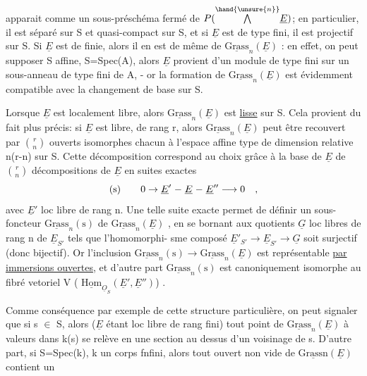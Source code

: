 
apparait comme un sous-préschéma fermé de $P(\overset{\hand{\unsure{n}}}{\bigwedge}\underline{E})$; en particulier, il
est séparé sur S et quasi-compact sur S, et  si $\underline{E}$  est de type fini,
il est projectif sur S. Si $\underline{E}$ est de  finie, alors
il en est de même de $\underline{\text{Grass}}_n(\underline{E})$ : en effet,  on peut
supposer S affine, S=Spec(A), alors $\underline{E}$ provient d'un module de type fini
sur un sous-anneau de type fini de A, -  or la formation de $\underline{\text{Grass}}_n(\underline{E})$
est évidemment compatible avec la changement de base sur S.

Lorsque $\underline{E}$  est localement libre, alors  $\underline{\text{Grass}}_n(\underline{E})$
est \uline{lisse} sur S. Cela provient du fait plus précis: si $\underline{E}$ est libre,
de rang r, alors  $\underline{\text{Grass}}_n(\underline{E})$  peut être recouvert par  $\binom{r}{n}$  ouverts
isomorphes chacun  à  l'espace affine type de dimension relative
n(r-n)  sur S.  Cette décomposition correspond au choix grâce à la base
de $\underline{E}$  de  $\binom{r}{n}$  décompositions de $\underline{E}$  en  suites
exactes
\[
\text{(s)} \qquad 0 \rightarrow \underline{E}' \relbar \underline{E} \relbar \underline{E}'' \longrightarrow 0 \quad ,
\]
avec $\underline{E}'$  loc libre de rang n.  Une telle suite exacte permet
de définir un sous-foncteur  $\underline{\text{Grass}}_n(\text{s})$  de  $\underline{\text{Grass}}_n(\underline{E})$ , en se bornant
aux  quotients  $\underline{G}$  loc libres de rang  n de  $\underline{E}_{S'}$  tels que l'homomorphi-%
sme composé  $\underline{E}'_{S'} \longrightarrow \underline{E}_{S'} \longrightarrow \underline{G}$  soit surjectif (donc bijectif). Or
l'inclusion  $\underline{\text{Grass}}_n(\text{s}) \rightarrow \underline{\text{Grass}}_n(\underline{E})$  est représentable \uline{par immersions
ouvertes}, et d'autre part  $\underline{\text{Grass}}_n(\text{s})$  est canoniquement isomorphe
au fibré vetoriel    V ( $\underline{\text{Hom}}_{\underline{O}_S}(\underline{E}',\underline{E}'')$) .

Comme conséquence par exemple de cette structure particulière,
on peut signaler que si s $\in$ S, alors ($\underline{E}$ étant loc libre de rang fini)
tout point de $\underline{\text{Grass}}_n(\underline{E})$  à valeurs dans k(s)  se relève en une section
au dessus d'un voisinage de s.  D'autre part, si S=Spec(k),  k
un corps fnfini, alors tout ouvert non vide de $\underline{\text{Grassn}}(\underline{E})$  contient un

